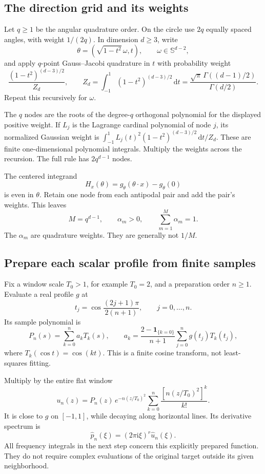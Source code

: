 \documentclass[11pt,letterpaper]{article}
\newcommand{\dd}{\,\mathrm d}
\newcommand{\ii}{\mathrm i}
\theoremstyle{definition}
\theoremstyle{remark}
\begin{document}
\subsection{The direction grid and its weights}
Let \(q\ge1\) be the angular quadrature order. On the circle use \(2q\)
equally spaced angles, with weight \(1/(2q)\). In dimension \(d\ge3\), write
\[
 \theta=(\sqrt{1-t^2}\,\omega,t),\qquad \omega\in\mathbb S^{d-2},
\]
and apply \(q\)-point Gauss--Jacobi quadrature in \(t\) with probability weight
\[
 \frac{(1-t^2)^{(d-3)/2}}{Z_d},\qquad
 Z_d=\int_{-1}^{1}(1-t^2)^{(d-3)/2}\dd t
     =\frac{\sqrt\pi\,\Gamma((d-1)/2)}{\Gamma(d/2)}.
\]
Repeat this recursively for \(\omega\).

The \(q\) nodes are the roots of the degree-\(q\)
orthogonal polynomial for the displayed positive weight. If \(L_j\) is the
Lagrange cardinal polynomial of node \(j\), its normalized Gaussian weight is
\(\int_{-1}^1L_j(t)^2(1-t^2)^{(d-3)/2}\dd t/Z_d\).
These are finite one-dimensional polynomial integrals. Multiply the weights
across the recursion. The full rule has \(2q^{d-1}\) nodes.

The centered integrand
\[
 H_x(\theta)=g_\theta(\theta\cdot x)-g_\theta(0)
\]
is even in \(\theta\). Retain one node from each antipodal pair and add the
pair's weights. This leaves
\[
 M=q^{d-1},\qquad \alpha_m>0,\qquad \sum_{m=1}^M\alpha_m=1.
\]
The \(\alpha_m\) are quadrature weights. They are generally not \(1/M\).

\subsection{Prepare each scalar profile from finite samples}
Fix a window scale \(T_0>1\), for example \(T_0=2\), and a preparation order
\(n\ge1\). Evaluate a real profile \(g\) at
\[
 t_j=\cos\frac{(2j+1)\pi}{2(n+1)},\qquad j=0,\ldots,n.
\]
Its sample polynomial is
\[
 P_n(s)=\sum_{k=0}^n a_kT_k(s),\qquad
 a_k=\frac{2-\mathbf 1_{\{k=0\}}}{n+1}
           \sum_{j=0}^ng(t_j)T_k(t_j),
\]
where \(T_k(\cos t)=\cos(kt)\). This is a finite cosine transform, not
least-squares fitting.

Multiply by the entire flat window
\begin{equation}\label{eq:prepared}
 u_n(z)=P_n(z)\,e^{-n(z/T_0)^2}
             \sum_{k=0}^n\frac{[n(z/T_0)^2]^k}{k!}.
\end{equation}
It is close to \(g\) on \([-1,1]\), while decaying along horizontal lines.
Its derivative spectrum is
\[
 \widehat p_n(\xi)=(2\pi\ii\xi)^r\widehat u_n(\xi).
\]
All frequency integrals in the next step concern this explicitly prepared
function. They do not require complex evaluations of the original target
outside its given neighborhood.
\end{document}
